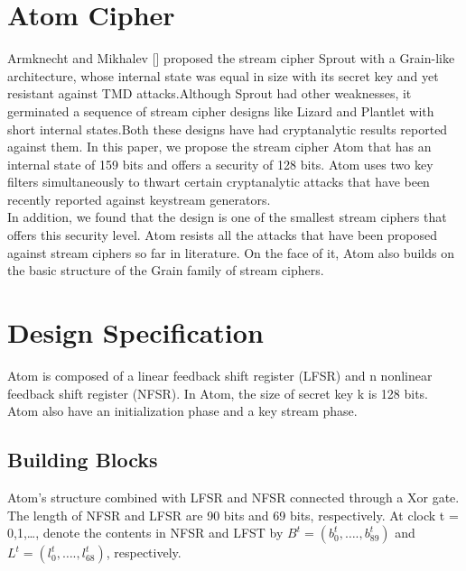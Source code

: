 \section{Atom Cipher}
Armknecht and Mikhalev [\cite{banik2021atom}] proposed the stream cipher Sprout with a Grain-like architecture, whose internal state was equal in size with its secret key and yet resistant against TMD attacks.Although Sprout had other weaknesses, it germinated a sequence of stream cipher designs like Lizard and Plantlet with short internal states.Both these designs have had cryptanalytic results reported against them. In this paper, we propose the stream cipher Atom that has an internal state of 159 bits and offers a security of 128 bits. Atom uses two key filters simultaneously to thwart certain cryptanalytic attacks that have been recently reported against keystream generators. \\[2mm] In addition, we found that the design is one of the smallest stream ciphers that offers this security level. Atom resists all the attacks that have been proposed against stream ciphers so far in literature. On the face of it, Atom also builds on the basic structure of the Grain family of stream ciphers.
\section{Design Specification}
Atom is composed of a linear feedback shift
register (LFSR) and n nonlinear feedback shift
register (NFSR). In Atom, the size of secret key
k is 128 bits. Atom also have an initialization
phase and a key stream phase.
\subsection{Building Blocks}
Atom’s structure combined with LFSR
and NFSR connected through a Xor
gate. The length of NFSR and LFSR are
90 bits and 69 bits, respectively. At
clock t = 0,1,…, denote the contents in
NFSR and LFST by $B^t = (b^t_0 ,….,b^t_{89} )$ and
$L^t = (l^t_0 ,….,l^t_{68} )$, respectively.
